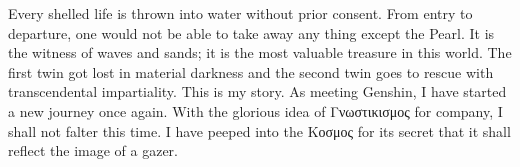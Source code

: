 Every shelled life is thrown into water without prior consent. From entry to departure, one would not be able to take away any thing except the Pearl. It is the witness of waves and sands; it is the most valuable treasure in this world. The first twin got lost in material darkness and the second twin goes to rescue with transcendental impartiality. This is my story. As meeting Genshin, I have started a new journey once again. With the glorious idea of Γνωστικισμος for company, I shall not falter this time. I have peeped into the Κοσμος for its secret that it shall reflect the image of a gazer.


